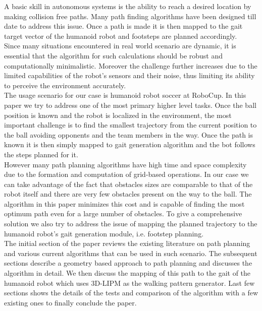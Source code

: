 \documentclass[letterpaper, 10 pt, conference]{ieeeconf}  %
\begin{document}
A basic skill in autonomous systems is the ability to reach a desired location by making collision free paths. Many path finding algorithms have been designed till date to address this issue. Once a path is made it is then mapped to the gait target vector of the humanoid robot and footsteps are planned accordingly. \\
Since many situations encountered in real world scenario are dynamic, it is essential that the algorithm for such calculations should be robust and computationally minimalistic. Moreover the challenge further increases due to the limited capabilities of the robot's sensors and their noise, thus limiting its ability to perceive the environment accurately.\\
The usage scenario for our case is humanoid robot soccer at RoboCup. In this paper we try to address one of the most primary higher level tasks. Once the ball position is known and the robot is localized in the environment, the most important challenge is to find the smallest trajectory from the current position to the ball avoiding opponents and the team members in the way. Once the path is known it is then simply mapped to gait generation algorithm and the bot follows the steps planned for it.\\
However many path planning algorithms have high time and space complexity due to the formation and computation of grid-based operations. In our case we can take advantage of the fact that obstacles sizes are comparable to that of the robot itself and there are very few obstacles present on the way to the ball. The algorithm in this paper minimizes this cost and is capable of finding the most optimum path even for a large number of obstacles. To give a comprehensive solution we also try to address the issue of mapping the planned trajectory to the humanoid robot's gait generation module, i.e. footstep planning.\\
The initial section of the paper reviews the existing literature on path planning and various current algorithms that can be used in such scenario. The subsequent sections describe a geometry based approach to path planning and discusses the algorithm in detail. We then discuss the mapping of this path to the gait of the humanoid robot which uses 3D-LIPM as the walking pattern generator. Last few sections shows the details of the tests and comparison of the algorithm with a few existing ones to finally conclude the paper.
\end{document}
